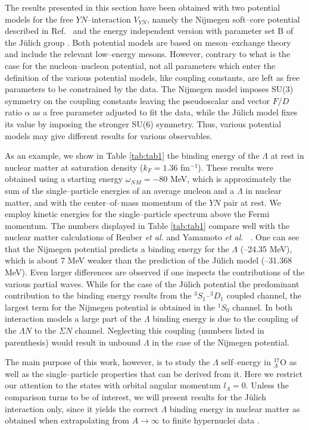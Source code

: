 The results presented in this section have been obtained with
two potential models for the free $YN$--interaction $V_{YN}$, namely the
Nijmegen soft--core potential described
in Ref.\  \cite{nijmegen} and the
energy independent version with parameter set B of the
J\"ulich group
 \cite{juelich,reuber}. 
Both potential models are based on meson--exchange theory and include
the relevant low--energy mesons.
However,
contrary to what is the case for the nucleon--nucleon potential,
not all parameters which enter the definition of the various potential
models, like coupling constants, are left as free
parameters to be constrained by the data.
The Nijmegen model imposes SU(3) symmetry on the coupling constants
leaving the pseudoscalar and vector $F/D$ ratio $\alpha$ as a free parameter
adjusted to fit the data, while the J\"ulich
model fixes its value by imposing the stronger SU(6)
symmetry. Thus, various
potential models may give different results for various observables.

As an example, we show in Table \ref{tab:tab1} the binding energy
of the $\Lambda$ at rest in nuclear matter at
saturation density ($k_F=1.36$ fm$^{-1}$). 
These results were obtained using a starting energy
$\omega_{NM}=-80$ MeV,
which is approximately the sum of the
single--particle energies of an average nucleon and a $\Lambda$ in
nuclear matter,
and with the center--of--mass momentum of the $YN$ pair
at rest. We employ kinetic energies for the single--particle spectrum
above the Fermi momentum.  The numbers displayed in Table \ref{tab:tab1}
compare well with the nuclear matter calculations
of Reuber {\em et al.}  \cite{reuber} and
Yamamoto {\em et al.\ }  \cite{yamamoto}.
One can see that the Nijmegen potential predicts a binding energy for
the $\Lambda$ (--24.35 MeV), which is about 7 MeV weaker than the
prediction of the J\"ulich model (--31.368 MeV). Even larger differences
are observed if one inspects the contributions of the various partial
waves. While for the case of the J\"ulich potential the predominant
contribution to the binding energy results from the $^3S_{1}$--$^3D_{1}$
coupled channel, the largest term for the Nijmegen potential is
obtained in the $^1S_{0}$ channel. In both interaction models a large
part of the $\Lambda$ binding energy is due to the coupling of the
$\Lambda N$ to the $\Sigma N$ channel. Neglecting this coupling
(numbers listed in parenthesis) would result in unbound $\Lambda$ in
the case of the Nijmegen potential.

The main purpose of this work, however, is to study the $\Lambda$
self--energy in $^{17}_{\Lambda}$O
as well as
the single--particle properties that can be derived from it.
Here we restrict our attention to
the states with orbital angular momentum
$l_{\Lambda}=0$. Unless the comparison turns to be of interest, 
we will present results for the J\"ulich interaction only, since
it yields the correct $\Lambda$ binding energy in nuclear matter as
obtained when extrapolating from $A\to \infty$ to finite hypernuclei
data \cite{bando3}.

